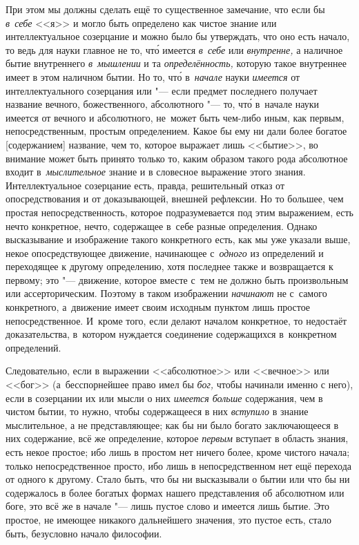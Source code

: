 При этом мы должны сделать ещё то существенное замечание, что если бы
{\em в~себе} <<я>> и могло быть определено как чистое знание или
интеллектуальное созерцание и можно было бы утверждать, что оно есть начало, то
ведь для науки главное не то, чт\'{о} имеется {\em в~себе} или {\em внутренне,}
а наличное бытие внутреннего {\em в~мышлении} и та {\em определённость,}
которую такое внутреннее имеет в этом наличном бытии. Но то, чт\'{о}
в~{\em начале} науки {\em имеется} от интеллектуального созерцания или "---
если предмет последнего получает название вечного, божественного, абсолютного
"--- то, чт\'{о} в~начале науки имеется от вечного и абсолютного, не~может быть
чем-либо иным, как первым, непосредственным, простым определением. Какое бы
ему ни дали более богатое [содержанием] название, чем то, которое выражает
лишь <<бытие>>, во внимание может быть принято только то, каким образом
такого рода абсолютное входит в~{\em мыслительное} знание и в словесное
выражение этого знания. Интеллектуальное созерцание есть, правда,
решительный отказ от опосредствования и от доказывающей, внешней рефлексии. Но то
большее, чем простая непосредственность, которое подразумевается под этим
выражением, есть нечто конкретное, нечто, содержащее в~себе разные определения.
Однако высказывание и изображение такого конкретного есть, как мы уже указали
выше, некое опосредствующее движение, начинающее с~{\em одного} из определений
и переходящее к другому определению, хотя последнее также и возвращается к
первому; это "--- движение, которое вместе с~тем не должно быть произвольным
или ассерторическим. Поэтому в таком изображении {\em начинают} не с~самого
конкретного, а~движение имеет своим исходным пунктом лишь простое
непосредственное. И~кроме того, если делают началом конкретное, то недостаёт
доказательства, в~котором нуждается соединение содержащихся в~конкретном
определений.

Следовательно, если в выражении <<абсолютное>> или <<вечное>> или <<бог>>
(а~бесспорнейшее право имел бы {\em бог,} чтобы начинали именно с него), если
в созерцании их или мысли о них {\em имеется больше} содержания, чем в чистом
бытии, то нужно, чтобы содержащееся в них {\em вступило} в знание мыслительное,
а не представляющее; как бы ни было богато заключающееся в них содержание, всё
же определение, которое {\em первым} вступает в область знания, есть некое
простое; ибо лишь в простом нет ничего более, кроме чистого начала; только
непосредственное просто, ибо лишь в непосредственном нет ещё перехода от одного
к другому. Стало быть, что бы ни высказывали о бытии или что бы ни содержалось
в более богатых формах нашего представления об абсолютном или боге, это всё же
в начале "--- лишь пустое слово и имеется лишь бытие. Это простое, не имеющее
никакого дальнейшего значения, это пустое есть, стало быть, безусловно начало
философии.

